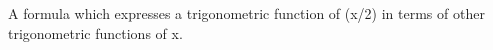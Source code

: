 A formula which expresses a trigonometric function of (x/2) in terms of other
trigonometric functions of x.
